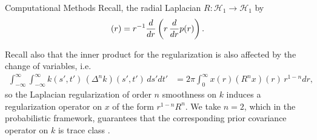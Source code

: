 \begin{chapter}{Computational Methods}
  Recall, the radial Laplacian $R: \mathcal H_1 \to \mathcal H_1$ by
  \begin{equation}
    [Rp](r) = r^{-1}\frac{d}{dr}\left(r \,\frac{d}{dr}p(r)\right). \\
  \end{equation}

  Recall also that the inner product for the regularization is also affected by the change of variables, i.e.
  \begin{eqnarray}
    \int_{-\infty}^\infty\int_{-\infty}^\infty k(s',t')\,(\Delta^n k)(s',t')\,ds'dt'
    &= 2\pi\int_0^\infty x(r) (R^nx)(r)\, r^{1-n}dr, \label{radialProfilePrior}
  \end{eqnarray}
  so the Laplacian regularization of order $n$ smoothness on $k$ induces a regularization operator on $x$ of the form $r^{1-n} R^n$.
  We take $n=2$, which in the probabilistic framework, guarantees that the corresponding prior covariance operator on $k$ is trace class \cite{Stu10}.


\end{chapter}

